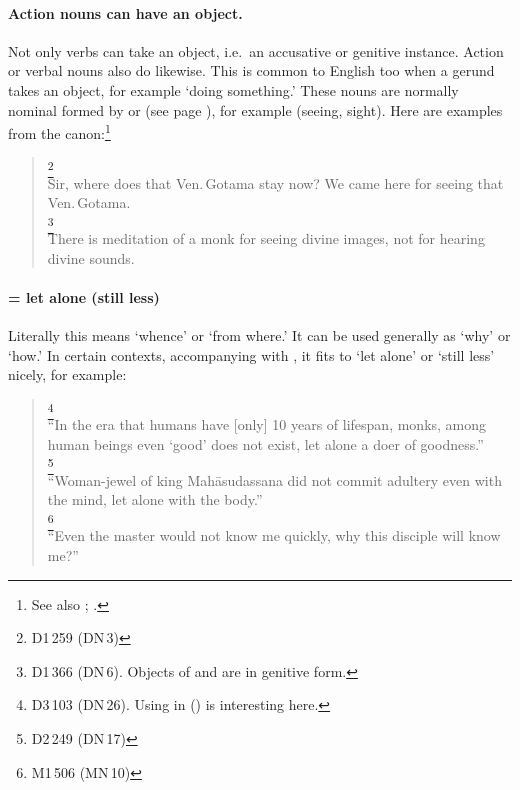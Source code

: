\paragraph*{Action nouns can have an object.} Not only verbs can take an object, i.e.\ an accusative or genitive instance. Action or verbal nouns also do likewise. This is common to English too when a gerund takes an object, for example `doing something.' These nouns are normally nominal  formed by  or  (see page \pageref{pacck2:yu}), for example  (seeing, sight). Here are examples from the canon:\footnote{See also \citealp[p.~138]{warder:intro}; \citealp[pp.~381--2]{perniola:grammar}.}

\begin{quote}
\footnote{D1\,259 (DN\,3)}\\
Sir, where does that Ven.\,Gotama stay now? We came here for seeing that Ven.\,Gotama.\\[1.5mm]
\footnote{D1\,366 (DN\,6). Objects of  and  are in genitive form.}\\
There is meditation of a monk for seeing divine images, not for hearing divine sounds.\\
\end{quote}

\paragraph*{ = let alone (still less)} Literally this means `whence' or `from where.' It can be used generally as `why' or `how.' In certain contexts, accompanying with , it fits to `let alone' or `still less' nicely, for example:

\begin{quote} 
\footnote{D3\,103 (DN\,26). Using  in  () is interesting here.}\\
``In the era that humans have [only] 10 years of lifespan, monks, among human beings even `good' does not exist, let alone a doer of goodness.''\\[1.5mm]
\footnote{D2\,249 (DN\,17)}\\
``Woman-jewel of king Mah\=asudassana did not commit adultery even with the mind, let alone with the body.''\\[1.5mm]
\footnote{M1\,506 (MN\,10)}\\
``Even the master would not know me quickly, why this disciple will know me?''\\[1.5mm]
\end{quote}

